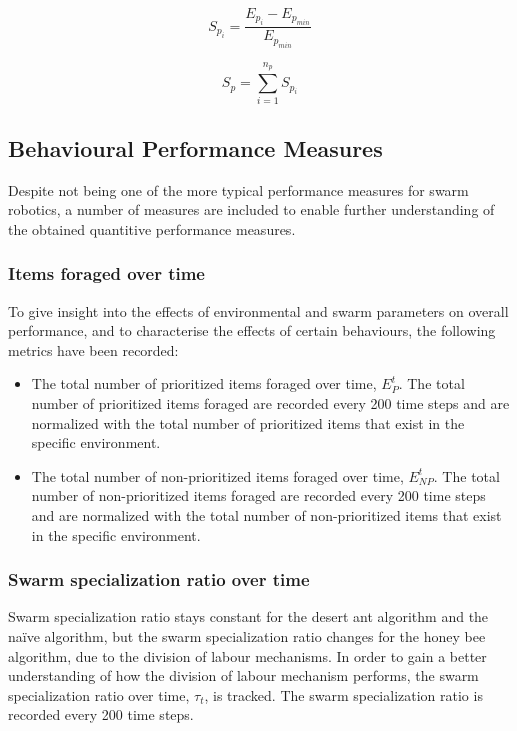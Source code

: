\begin{equation}
	S_{p_i} = \dfrac{E_{p_{i}} - E_{p_{min}}}{E_{p_{min}}}
\end{equation}

\begin{equation}
	S_p = \sum_{i=1}^{n_p} S_{p_i}
\end{equation}

\subsection{Behavioural Performance Measures}
\label{behaviouralperformancemeasures}

Despite not being one of the more typical performance measures for swarm robotics, a number of measures are included to enable further understanding of the obtained quantitive performance measures.

\subsubsection{Items foraged over time}
To give insight into the effects of environmental and swarm parameters on overall performance, and to characterise the effects of certain behaviours, the following metrics have been recorded:

\begin{itemize}
\item The total number of prioritized items foraged over time, $E^t_P$. The total number of prioritized items foraged are recorded every 200 time steps and are normalized with the total number of prioritized items that exist in the specific environment.
\item The total number of non-prioritized items foraged over time, $E^t_{NP}$. The total number of non-prioritized items foraged are recorded every 200 time steps and are normalized with the total number of non-prioritized items that exist in the specific environment.
\end{itemize}

\subsubsection{Swarm specialization ratio over time}
Swarm specialization ratio stays constant for the desert ant algorithm and the na\"ive algorithm, but the swarm specialization ratio changes for the honey bee algorithm, due to the division of labour mechanisms. In order to gain a better understanding of how the division of labour mechanism performs, the swarm specialization ratio over time, $\tau_t$, is tracked. The swarm specialization ratio is recorded every 200 time steps.

